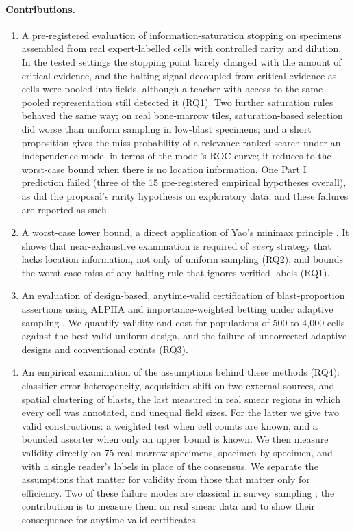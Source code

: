 \documentclass[11pt]{article}
\theoremstyle{remark}
\theoremstyle{definition}
\begin{document}
\paragraph{Contributions.}
\begin{enumerate}
\item A pre-registered evaluation of information-saturation stopping on specimens assembled from real expert-labelled cells with controlled rarity and dilution. In the tested settings the stopping point barely changed with the amount of critical evidence, and the halting signal decoupled from critical evidence as cells were pooled into fields, although a teacher with access to the same pooled representation still detected it (RQ1). Two further saturation rules behaved the same way; on real bone-marrow tiles, saturation-based selection did worse than uniform sampling in low-blast specimens; and a short proposition gives the miss probability of a relevance-ranked search under an independence model in terms of the model's ROC curve; it reduces to the worst-case bound when there is no location information. One Part I prediction failed (three of the 15 pre-registered empirical hypotheses overall), as did the proposal's rarity hypothesis on exploratory data, and these failures are reported as such.
\item A worst-case lower bound, a direct application of Yao's minimax principle \cite{yao1977}. It shows that near-exhaustive examination is required of \emph{every} strategy that lacks location information, not only of uniform sampling (RQ2), and bounds the worst-case miss of any halting rule that ignores verified labels (RQ1).
\item An evaluation of design-based, anytime-valid certification of blast-proportion assertions using ALPHA \cite{stark2023alpha} and importance-weighted betting under adaptive sampling \cite{shekhar2023rlfa}. We quantify validity and cost for populations of 500 to 4,000 cells against the best valid uniform design, and the failure of uncorrected adaptive designs and conventional counts (RQ3).
\item An empirical examination of the assumptions behind these methods (RQ4): classifier-error heterogeneity, acquisition shift on two external sources, and spatial clustering of blasts, the last measured in real smear regions in which every cell was annotated, and unequal field sizes. For the latter we give two valid constructions: a weighted test when cell counts are known, and a bounded assorter when only an upper bound is known. We then measure validity directly on 75 real marrow specimens, specimen by specimen, and with a single reader's labels in place of the consensus. We separate the assumptions that matter for validity from those that matter only for efficiency. Two of these failure modes are classical in survey sampling \cite{kish1965,cochran1977}; the contribution is to measure them on real smear data and to show their consequence for anytime-valid certificates.
\end{enumerate}
\end{document}
